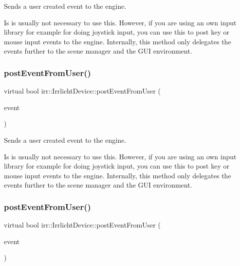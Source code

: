 Sends a user created event to the engine. 

Is is usually not necessary to use this. However, if you are using an own input library for example for doing joystick input, you can use this to post key or mouse input events to the engine. Internally, this method only delegates the events further to the scene manager and the G\+UI environment. \mbox{\label{classirr_1_1IrrlichtDevice_abf859e39f017b0403c6ed331e48e01df}} 
\subsubsection{\texorpdfstring{post\+Event\+From\+User()}{postEventFromUser()}\hspace{0.1cm}{\footnotesize\ttfamily [2/3]}}
{\footnotesize\ttfamily virtual bool irr\+::\+Irrlicht\+Device\+::post\+Event\+From\+User (\begin{DoxyParamCaption}\item[{const \hyperlink{structirr_1_1SEvent}{S\+Event} \&}]{event }\end{DoxyParamCaption})\hspace{0.3cm}{\ttfamily [pure virtual]}}



Sends a user created event to the engine. 

Is is usually not necessary to use this. However, if you are using an own input library for example for doing joystick input, you can use this to post key or mouse input events to the engine. Internally, this method only delegates the events further to the scene manager and the G\+UI environment. \mbox{\label{classirr_1_1IrrlichtDevice_abf859e39f017b0403c6ed331e48e01df}} 
\subsubsection{\texorpdfstring{post\+Event\+From\+User()}{postEventFromUser()}\hspace{0.1cm}{\footnotesize\ttfamily [3/3]}}
{\footnotesize\ttfamily virtual bool irr\+::\+Irrlicht\+Device\+::post\+Event\+From\+User (\begin{DoxyParamCaption}\item[{const \hyperlink{structirr_1_1SEvent}{S\+Event} \&}]{event }\end{DoxyParamCaption})\hspace{0.3cm}{\ttfamily [pure virtual]}}



